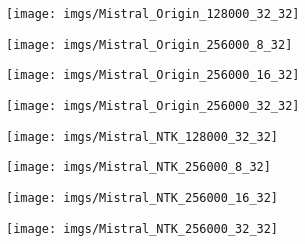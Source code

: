 \clearpage	
\begin{figure*}[ht]
	\centering
	\begin{minipage}{\textwidth}
		\centering
		\begin{minipage}{0.24\textwidth}
			\centering
			\texttt{[image: imgs/Mistral\_Origin\_128000\_32\_32]} %
		\end{minipage}%
		\begin{minipage}{0.24\textwidth}
			\centering
			\texttt{[image: imgs/Mistral\_Origin\_256000\_8\_32]} %
		\end{minipage}%
		\begin{minipage}{0.24\textwidth}
			\centering
			\texttt{[image: imgs/Mistral\_Origin\_256000\_16\_32]} %
		\end{minipage}%
		\begin{minipage}{0.24\textwidth}
			\centering
			\texttt{[image: imgs/Mistral\_Origin\_256000\_32\_32]} %
		\end{minipage}
	\end{minipage}
	\begin{minipage}{\textwidth}
		\centering
		\begin{minipage}{0.24\textwidth}
			\centering
			\texttt{[image: imgs/Mistral\_NTK\_128000\_32\_32]} %
		\end{minipage}%
		\begin{minipage}{0.24\textwidth}
			\centering
			\texttt{[image: imgs/Mistral\_NTK\_256000\_8\_32]} %
		\end{minipage}%
		\begin{minipage}{0.24\textwidth}
			\centering
			\texttt{[image: imgs/Mistral\_NTK\_256000\_16\_32]} %
		\end{minipage}%
		\begin{minipage}{0.24\textwidth}
			\centering
			\texttt{[image: imgs/Mistral\_NTK\_256000\_32\_32]} %
		\end{minipage}
	\end{minipage}
	\begin{minipage}{\textwidth}

\end{minipage}
\end{figure*}
